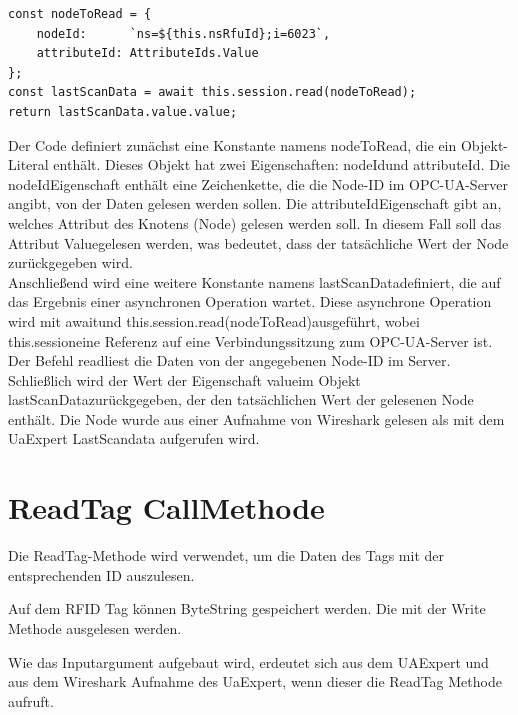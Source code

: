 \begin{lstlisting}[style=JavaScript, caption={ScanSettingsObj}]
const nodeToRead = {
    nodeId:      `ns=${this.nsRfuId};i=6023`,
    attributeId: AttributeIds.Value
};
const lastScanData = await this.session.read(nodeToRead);
return lastScanData.value.value;
\end{lstlisting}
Der Code definiert zunächst eine Konstante namens \dq nodeToRead\dq , die ein Objekt-Literal enthält. Dieses Objekt hat zwei Eigenschaften: \dq nodeId\dq  und \dq attributeId\dq . Die \dq nodeId\dq  Eigenschaft enthält eine Zeichenkette, die die Node-ID im OPC-UA-Server angibt, von der Daten gelesen werden sollen. Die \dq attributeId\dq  Eigenschaft gibt an, welches Attribut des Knotens (Node) gelesen werden soll. In diesem Fall soll das Attribut \dq Value\dq  gelesen werden, was bedeutet, dass der tatsächliche Wert der Node zurückgegeben wird.\\

Anschließend wird eine weitere Konstante namens \dq lastScanData\dq  definiert, die auf das Ergebnis einer asynchronen Operation wartet. Diese asynchrone Operation wird mit \dq await\dq  und \dq this.session.read(nodeToRead)\dq  ausgeführt, wobei \dq this.session\dq  eine Referenz auf eine Verbindungssitzung zum OPC-UA-Server ist. Der Befehl \dq read\dq  liest die Daten von der angegebenen Node-ID im Server.\\

Schließlich wird der Wert der Eigenschaft \dq value\dq  im Objekt \dq lastScanData\dq  zurückgegeben, der den tatsächlichen Wert der gelesenen Node enthält. Die Node wurde aus einer Aufnahme von Wireshark gelesen als mit dem UaExpert LastScandata aufgerufen wird.

\section{ReadTag CallMethode}

Die ReadTag-Methode wird verwendet, um die Daten des Tags mit der entsprechenden ID auszulesen.

Auf dem RFID Tag können ByteString gespeichert werden. Die mit der Write Methode ausgelesen werden.

Wie das Inputargument aufgebaut wird, erdeutet sich aus dem UAExpert und aus dem Wireshark Aufnahme des UaExpert, wenn dieser die ReadTag Methode aufruft. 

